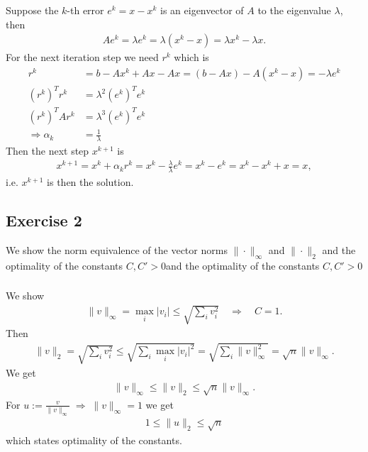 \subsubsection{}
Suppose the $k$-th error $e^k = x - x^k$ is an eigenvector of $A$ to the
eigenvalue $\lambda$, then
\begin{align}
    A e^{k}=\lambda e^{k} = \lambda (x^{k}-x) = \lambda x^{k} - \lambda x.
\end{align}
For the next iteration step we need $r^{k}$ which is
\begin{align}
    r^{k} &= b - Ax^{k} + Ax - Ax = (b - Ax) - A(x^{k} - x) = -\lambda e^{k}\\
    (r^k)^{T} r^k &= \lambda^2 (e^k)^{T}e^{k}\\
    (r^k)^{T} A r^k &= \lambda^3 (e^k)^{T}e^{k}\\
    \Rightarrow \alpha_k &= \frac{1}{\lambda}
\end{align}
Then the next step $x^{k+1}$ is
\begin{align}
    x^{k+1} = x^{k}+\alpha_k r^{k} = x^{k}-\frac{\lambda}{\lambda}e^{k} =
    x^{k} - e^{k} = x^{k}-x^{k}+ x = x,
\end{align}
i.e. $x^{k+1}$ is then the solution.
\subsection{Exercise 2}
We show the norm equivalence of the vector norms $ \|\cdot\|_\infty$ and
$\|\cdot\|_2$ and the optimality of the constants $C, C' > 0$and the
optimality of the constants $C, C' > 0$
\subsubsection{}
We show
\begin{align}
    \|v\|_\infty = \max_i |v_i| \leq \sqrt{\sum_{i}^{} v_i^2}  \quad
    \Rightarrow \quad C = 1.
\end{align}
Then
\begin{align}
    \|v\|_2 = \sqrt{\sum_i v_i^2} \le \sqrt{\sum_i \max_i |v_i|^2}  =
    \sqrt{\sum_i  \|v\|^2_\infty} = \sqrt{n} \|v\|_\infty.
\end{align}
We get
\begin{align}
    \|v\|_\infty \le \|v\|_2 \le \sqrt{n} \|v\|_\infty.
\end{align}
For $u := \frac{v}{\|v\|_\infty} \; \Rightarrow \; \|v\|_\infty = 1$ we get
\begin{align}
    1 \le  \|u\|_2 \le \sqrt{n}
\end{align}
which states optimality of the constants.
